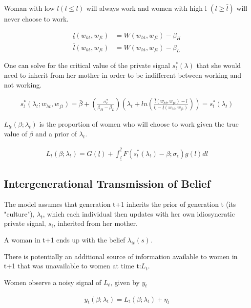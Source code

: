 \documentclass[titlepage]{\econtex}
\begin{document}
Woman with low $l(l \leq \underline{l})$ will always work and women with high l $(l \geq \bar{l})$ will never choose to work.

\begin{align*}
\underline{l}(w_{h t}, w_{f t}) &= W(w_{h t}, w_{f t})-\beta_H\\
\bar{l}(w_{h t}, w_{f t})&=W(w_{h t}, w_{f t})-\beta_L
\end{align*}

One can solve for the critical value of the private signal $s_{l}^{*}(\lambda)$ that she would need to inherit from her mother in order to be indifferent between working and not working.

\begin{align*}
s_{l}^{*} (\lambda_t ; w_{h t}, w_{f t} )=\bar{\beta} + (\frac{\sigma_{\epsilon}^2}{\beta_H-\beta_L})(\lambda_t + ln (\frac{\bar{l}(w_{h t}, w_{f t})-l}{l_l - \underline{l}(w_{h t}, w_{f t})})) = s_{l}^{*}(\lambda_t)
\end{align*}

$L_{l t}(\beta ; \lambda_t)$ is the proportion of women who will choose to work given the true value of $\beta$ and a prior of $\lambda_t$.

\begin{align*}
L_t(\beta ; \lambda_t) = G(\underline{l})+\int_{\underline{l}}^{\bar{l}} F(s_{l}^{*}(\lambda_t)-\beta ; \sigma_{\epsilon})g(l)dl
\end{align*}

\hypertarget{Intergenrational Transmission of Belief}{}
\subsection{Intergenerational Transmission of Belief}

The model assumes that generation t+1 inherits the prior of generation t (its "culture"), $\lambda_t$, which each individual then updates with her own idiosyncratic private signal, $s_i$, inherited from her mother.

A woman in t+1 ends up with the belief $\lambda_{i t}(s)$.

There is potentially an additional source of information available to women in t+1 that was unavailable to women at time t:$L_t$.

Women observe a noisy signal of $L_t$, given by $y_t$

\begin{align*}
y_t(\beta ; \lambda_t ) = L_t (\beta ; \lambda_t ) + \eta_t
\end{align*}
\end{document}
